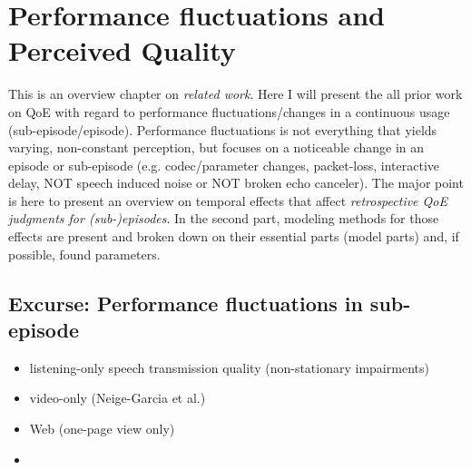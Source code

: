 \chapter{Performance fluctuations and Perceived Quality}\label{chap:04}
\begin{chapter-abstract}
This is an overview chapter on \textit{related work}.
Here I will present the all prior work on QoE with regard to performance fluctuations/changes in a continuous usage (sub-episode/episode).
Performance fluctuations is not everything that yields varying, non-constant perception, but focuses on a noticeable change in an episode or sub-episode (e.g. codec/parameter changes, packet-loss, interactive delay, NOT speech induced noise or NOT broken echo canceler).
The major point is here to present an overview on temporal effects that affect \textit{retrospective QoE judgments for (sub-)episodes}.
In the second part, modeling methods for those effects are present and broken down on their essential parts (model parts) and, if possible, found parameters.






\end{chapter-abstract}




\section{Excurse: Performance fluctuations in sub-episode} %
\begin{itemize}
\item listening-only speech transmission quality (non-stationary impairments)
\item video-only (Neige-Garcia et al.)
\item Web (one-page view only)
\item \cite{hands_recency_2001}
\end{itemize}


